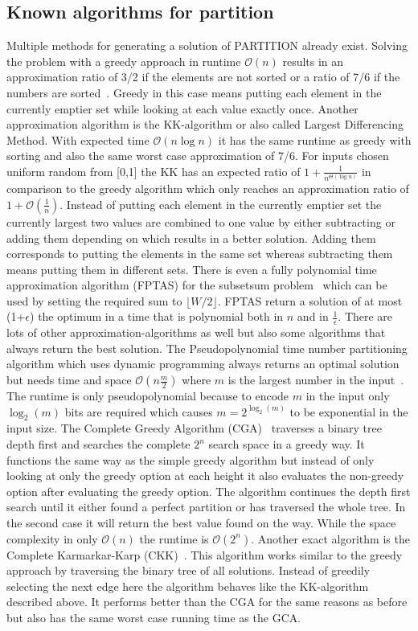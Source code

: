 \subsection{Known algorithms for partition}
Multiple methods for generating a solution of PARTITION already exist.
Solving the problem with a greedy approach in runtime $\mathcal{O}(n)$ results in an approximation ratio of 3/2 if the elements are not sorted or a ratio of 7/6 if the numbers are sorted~\cite{graham1966bounds}.
Greedy in this case means putting each element in the currently emptier set while looking at each value exactly once.
Another approximation algorithm is the KK-algorithm or also called Largest Differencing Method.
With expected time $\mathcal{O}(n\log{}n)$ it has the same runtime as greedy with sorting and also the same worst case approximation of 7/6.
For inputs chosen uniform random from [0,1] the KK has an expected ratio of \(1+\frac{1}{n^{\Theta(\log{}n)}}\) in comparison to the greedy algorithm which only reaches an approximation ratio of \(1+\mathcal{O}(\frac{1}{n})\).
Instead of putting each element in the currently emptier set the currently largest two values are combined to one value by either subtracting or adding them depending on which results in a better solution.
Adding them corresponds to putting the elements in the same set whereas subtracting them means putting them in different sets. 
There is even a fully polynomial time approximation algorithm (FPTAS) for the subsetsum problem~\cite{KELLERER2003349} which can be used by setting the required sum to $\lfloor W/2\rfloor$.
FPTAS return a solution of at most (1+$\epsilon$) the optimum in a time that is polynomial both in $n$ and in $\frac{1}{\epsilon}$.
There are lots of other approximation-algorithms as well but also some algorithms that always return the best solution.
The Pseudopolynomial time number partitioning algorithm which uses dynamic programming always returns an optimal solution but needs time and space $\mathcal{O}(n\frac{m}{2})$ where $m$ is the largest number in the input~\cite{korf2009multi}.
The runtime is only pseudopolynomial because to encode $m$ in the input only $\log_{2}{(m)}$ bits are required which causes \(m=2^{\log_{2}{(m)}}\) to be exponential in the input size.
The Complete Greedy Algorithm (CGA)~\cite{korf1998complete} traverses a binary tree depth first and searches the complete $2^n$ search space in a greedy way.
It functions the same way as the simple greedy algorithm but instead of only looking at only the greedy option at each height it also evaluates the non-greedy option after evaluating the greedy option.
The algorithm continues the depth first search until it either found a perfect partition or has traversed the whole tree.
In the second case it will return the best value found on the way.
While the space complexity in only $\mathcal{O}(n)$ the runtime is $\mathcal{O}(2^n)$.
Another exact algorithm is the Complete Karmarkar-Karp (CKK)~\cite{korf1998complete}.
This algorithm works similar to the greedy approach by traversing the binary tree of all solutions.
Instead of greedily selecting the next edge here the algorithm behaves like the KK-algorithm described above.
It performs better than the CGA for the same reasons as before but also has the same worst case running time as the GCA.

